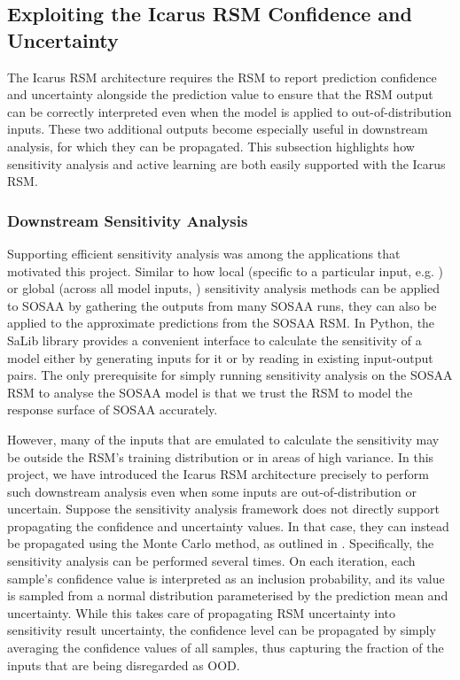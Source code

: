 \subsection{Exploiting the Icarus RSM Confidence and Uncertainty} \label{txt:future-icarus-propagation}

The Icarus RSM architecture requires the RSM to report prediction confidence and uncertainty alongside the prediction value to ensure that the RSM output can be correctly interpreted even when the model is applied to out-of-distribution inputs. These two additional outputs become especially useful in downstream analysis, for which they can be propagated. This subsection highlights how sensitivity analysis and active learning are both easily supported with the Icarus RSM.

\subsubsection{Downstream Sensitivity Analysis}

Supporting efficient sensitivity analysis was among the applications that motivated this project. Similar to how local (specific to a particular input, e.g. \cite{air-quality-sensitivity-2003}) or global (across all model inputs, \cite{global-sensitivity-2015}) sensitivity analysis methods can be applied to SOSAA by gathering the outputs from many SOSAA runs, they can also be applied to the approximate predictions from the SOSAA RSM. In Python, the SaLib library \cite{salib-2017, salib-2.0-2022} provides a convenient interface to calculate the sensitivity of a model either by generating inputs for it or by reading in existing input-output pairs. The only prerequisite for simply running sensitivity analysis on the SOSAA RSM to analyse the SOSAA model is that we trust the RSM to model the response surface of SOSAA accurately.

However, many of the inputs that are emulated to calculate the sensitivity may be outside the RSM's training distribution or in areas of high variance. In this project, we have introduced the Icarus RSM architecture precisely to perform such downstream analysis even when some inputs are out-of-distribution or uncertain. Suppose the sensitivity analysis framework does not directly support propagating the confidence and uncertainty values. In that case, they can instead be propagated using the Monte Carlo method, as outlined in . Specifically, the sensitivity analysis can be performed several times. On each iteration, each sample's confidence value is interpreted as an inclusion probability, and its value is sampled from a normal distribution parameterised by the prediction mean and uncertainty. While this takes care of propagating RSM uncertainty into sensitivity result uncertainty, the confidence level can be propagated by simply averaging the confidence values of all samples, thus capturing the fraction of the inputs that are being disregarded as OOD.

